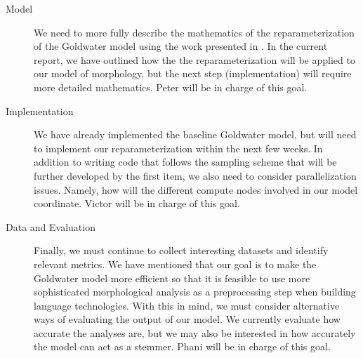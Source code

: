 \documentclass{article}
\begin{document}
\begin{description}
\item[Model] We need to more fully describe the mathematics of the
  reparameterization of the Goldwater model using the work presented
  in \cite{lovell2012}. In the current report, we have outlined how
  the the reparameterization will be applied to our model of
  morphology, but the next step (implementation) will require more
  detailed mathematics. Peter will be in charge of this goal.

\item[Implementation] We have already implemented the baseline
  Goldwater model, but will need to implement our reparameterization
  within the next few weeks. In addition to writing code that follows
  the sampling scheme that will be further developed by the first
  item, we also need to consider parallelization issues. Namely, how
  will the different compute nodes involved in our model
  coordinate. Victor will be in charge of this goal.

\item[Data and Evaluation] Finally, we must continue to collect
  interesting datasets and identify relevant metrics. We have
  mentioned that our goal is to make the Goldwater model more
  efficient so that it is feasible to use more sophisticated
  morphological analysis as a preprocessing step when building
  language technologies. With this in mind, we must consider
  alternative ways of evaluating the output of our model. We currently
  evaluate how accurate the analyses are, but we may also be
  interested in how accurately the model can act as a stemmer. Phani
  will be in charge of this goal.
\end{description}



\end{document}
